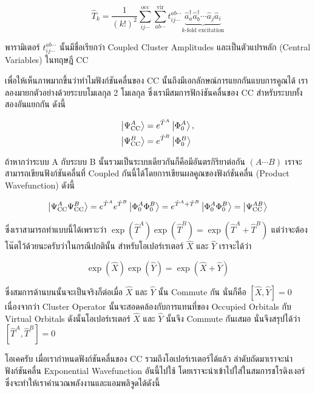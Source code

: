 \begin{equation}
  \hat{T}_k
  =
  \frac{1}{(k!)^2} \sum_{ij\cdots}^{\mathrm{occ}} \sum_{ab\cdots}^{\mathrm{vir}} t_{ij\cdots}^{ab\cdots}
  \underbrace{
    \hat{a}_{a}^{\dagger} \hat{a}_{b}^{\dagger} \cdots \hat{a}_{j}^{\,} \hat{a}_{i}^{\,}
  }_{
    k\text{-fold excitation}
  }
\end{equation}

\noindent พารามิเตอร์ $t_{ij\cdots}^{ab\cdots}$ นั้นมีชื่อเรียกว่า Coupled Cluster Amplitudes และเป็นตัวแปรหลัก (Central
Variables) ในทฤษฎี CC

เพื่อให้เห็นภาพมากขึ้นว่าทำไมฟังก์ชันคลื่นของ CC นั้นถึงมีเอกลักษณ์การแยกกันแบบการคูณได้ เราลองมายกตัวอย่างด้วยระบบโมเลกุล 2 โมเลกุล
ซึ่งเรามีสมการฟักง์ชันคลื่นของ CC สำหรับระบบทั้งสองอันแยกกัน ดังนี้

\begin{align}
  \ket{\Psi_{\mathrm{CC}}^A} & = e^{\hat{T}^A} \ket{\Phi_0^A}, \\
  \ket{\Psi_{\mathrm{CC}}^B} & = e^{\hat{T}^B} \ket{\Phi_0^B}
\end{align}

\noindent ถ้าหากว่าระบบ A กับระบบ B นั้นรวมเป็นระบบเดียวกันก็คือมีอันตรกิริยาต่อกัน $(A \cdots B)$ เราจะสามารถเขียนฟังก์ชันคลื่นที่
Coupled กันนี้ได้โดยการเขียนผลคูณของฟังก์ชันคลื่น (Product Wavefunction) ดังนี้

\begin{align}
  \ket{\Psi_{\mathrm{CC}}^A \Psi_{\mathrm{CC}}^B}
  = e^{\hat{T}^A} e^{\hat{T}^B}\ket{\Phi_0^A\Phi_0^B}
  = e^{\hat{T}^A+\hat{T}^B}\ket{\Phi_0^A\Phi_0^B}
  = \ket{\Psi_{\mathrm{CC}}^{AB}}
\end{align}

\noindent ซึ่งเราสามารถทำแบบนี้ได้เพราะว่า $\exp(\hat{T}^A)\exp(\hat{T}^B) = \exp(\hat{T}^A + \hat{T}^B)$
แต่ว่าจะต้องโน๊ตไว้ด้วยนะครับว่าในกรณีปกตินั้น สำหรับโอเปอร์เรเตอร์ $\hat{X}$ และ $\hat{Y}$ เราจะได้ว่า

\begin{equation}
  \exp(\hat{X})\exp(\hat{Y}) = \exp(\hat{X} + \hat{Y})
\end{equation}

\noindent ซึ่งสมการด้านบนนั้นจะเป็นจริงก็ต่อเมื่อ $\hat{X}$ และ $\hat{Y}$ นั้น Commute กัน นั่นก็คือ $[\hat{X}, \hat{Y}] = 0$
เนื่องจากว่า Cluster Operator นั้นจะสอดคล้องกับการแทนที่ของ Occupied Orbitals กับ Virtual Orbitals ดังนั้นโอเปอร์เรเตอร์
$\hat{X}$ และ $\hat{Y}$ นั้นจึง Commute กันเสมอ นั่นจึงสรุปได้ว่า $[\hat{T}^A, \hat{T}^B] = 0$

โอเคครับ เมื่อเรากำหนดฟังก์ชันคลื่นของ CC รวมถึงโอเปอร์เรเตอร์ได้แล้ว ลำดับถัดมาเราจะนำฟังก์ชันคลื่น Exponential Wavefunction อันนี้ไปใช้
โดยเราจะนำเข้าไปใส่ในสมการชโรดิงเงอร์ซึ่งจะทำให้เราคำนวณพลังงานและแอมพลิจูดได้ดังนี้

